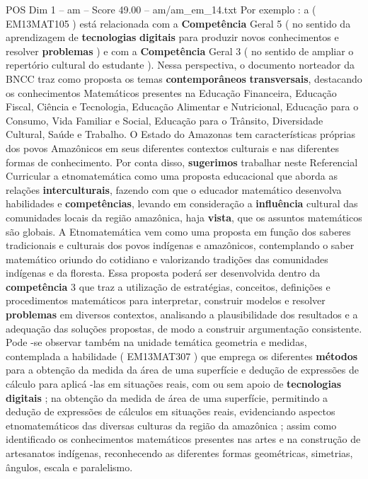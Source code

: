 \begin{textsample}{POS Dim 1 – am – Score 49.00 – am/am\_em\_14.txt}
Por exemplo : a ( EM13MAT105 ) está relacionada com a \textbf{Competência} Geral 5 ( no sentido da aprendizagem de \textbf{tecnologias} \textbf{digitais} para produzir novos conhecimentos e resolver \textbf{problemas} ) e com a \textbf{Competência} Geral 3 ( no sentido de ampliar o repertório cultural do estudante ).
Nessa perspectiva, o documento norteador da BNCC traz como proposta os temas \textbf{contemporâneos} \textbf{transversais}, destacando os conhecimentos Matemáticos presentes na Educação Financeira, Educação Fiscal, Ciência e Tecnologia, Educação Alimentar e Nutricional, Educação para o Consumo, Vida Familiar e Social, Educação para o Trânsito, Diversidade Cultural, Saúde e Trabalho.
O Estado do Amazonas tem características próprias dos povos Amazônicos em seus diferentes contextos culturais e nas diferentes formas de conhecimento.
Por conta disso, \textbf{sugerimos} trabalhar neste Referencial Curricular a etnomatemática como uma proposta educacional que aborda as relações \textbf{interculturais}, fazendo com que o educador matemático desenvolva habilidades e \textbf{competências}, levando em consideração a \textbf{influência} cultural das comunidades locais da região amazônica, haja \textbf{vista}, que os assuntos matemáticos são globais.
A Etnomatemática vem como uma proposta em função dos saberes tradicionais e culturais dos povos indígenas e amazônicos, contemplando o saber matemático oriundo do cotidiano e valorizando tradições das comunidades indígenas e da floresta.
Essa proposta poderá ser desenvolvida dentro da \textbf{competência} 3 que traz a utilização de estratégias, conceitos, definições e procedimentos matemáticos para interpretar, construir modelos e resolver \textbf{problemas} em diversos contextos, analisando a plausibilidade dos resultados e a adequação das soluções propostas, de modo a construir argumentação consistente.
Pode -se observar também na unidade temática geometria e medidas, contemplada a habilidade ( EM13MAT307 ) que emprega os diferentes \textbf{métodos} para a obtenção da medida da área de uma superfície e dedução de expressões de cálculo para aplicá -las em situações reais, com ou sem apoio de \textbf{tecnologias} \textbf{digitais} ; na obtenção da medida de área de uma superfície, permitindo a dedução de expressões de cálculos em situações reais, evidenciando aspectos etnomatemáticos das diversas culturas da região da amazônica ; assim como identificado os conhecimentos matemáticos presentes nas artes e na construção de artesanatos indígenas, reconhecendo as diferentes formas geométricas, simetrias, ângulos, escala e paralelismo.

\end{textsample}
